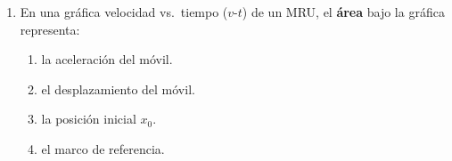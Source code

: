 \documentclass[12pt, letterpaper]{article}
\begin{document}
\begin{enumerate}[leftmargin=*, label=\textbf{\arabic*.}, itemsep=0.2em]
\begin{enumerate}[label=\alph*), leftmargin=1.8em, itemsep=0.14em]
\begin{multicols}{2}
\begin{enumerate}[label=\Alph*), leftmargin=1.5em, nosep]
                    \item avanza con velocidad positiva.
                    \item retrocede hacia el origen.
                    \item aumenta su velocidad.
                    \item permanece en reposo ($v = 0$).
                  \end{enumerate}
                \end{multicols}
          \item En una gráfica velocidad vs.\ tiempo ($v$-$t$) de un MRU, el \textbf{área} bajo la gráfica representa:
                \begin{multicols}{2}
                  \begin{enumerate}[label=\Alph*), leftmargin=1.5em, nosep]
                    \item la aceleración del móvil.
                    \item el desplazamiento del móvil.
                    \item la posición inicial $x_0$.
                    \item el marco de referencia.
                  \end{enumerate}
                \end{multicols}
        \end{enumerate}

\newpage


\end{enumerate}
\end{document}
